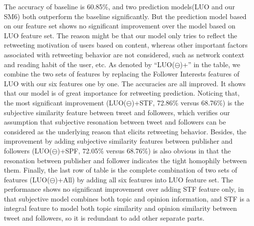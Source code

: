 \documentclass{acm_proc_article-sp}
\begin{document}
The accuracy of baseline is 60.85\%, and two prediction models(LUO and our SM6) both outperform the baseline significantly. 
But the prediction model based on our feature set shows no significant improvement over the model based on LUO feature set. 
The reason might be that our model only tries to reflect the retweeting motivation of users based on content, whereas other important factors associated with retweeting behavior are not considered, such as network context and reading habit of the user, etc. 
As denoted by ``LUO($ \ominus $)+'' in the table, we combine the two sets of features by replacing the Follower Interests features of LUO with our six features one by one. 
The accuracies are all improved. It shows that our model is of great importance for retweeting prediction. 
Noticing that, the most significant improvement (LUO($ \ominus $)+STF, 72.86\% versus 68.76\%) is the subjective similarity feature between tweet and followers, which verifies our assumption that subjective resonation between tweet and followers can be considered as the underlying reason that elicits retweeting behavior.
Besides, the improvement by adding subjective similarity features between publisher and followers (LUO($ \ominus $)+SPF, 72.05\% versus 68.76\%) is also obvious in that the resonation between publisher and follower indicates the tight homophily between them.
Finally, the last row of table is the complete combination of two sets of features (LUO($ \ominus $)+All) by adding all six features into LUO feature set. 
The performance shows no significant improvement over adding STF feature only, in that subjective model combines both topic and opinion information, and STF is a integral feature to model both topic similarity and opinion similarity between tweet and followers, so it is redundant to add other separate parts.
\end{document}
